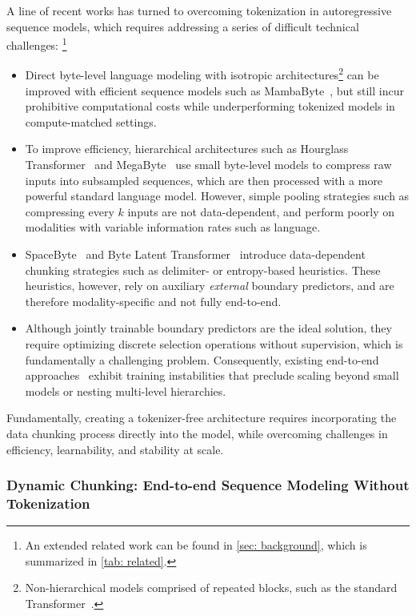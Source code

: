 \documentclass{article}
\newcommand{\citep}{\parencite}
\theoremstyle{plain}
\theoremstyle{remark}
\begin{document}
A line of recent works has turned to overcoming tokenization in autoregressive sequence models, which requires addressing a series of difficult technical challenges:
\footnote{An extended related work can be found in \cref{sec: background}, which is summarized in \cref{tab: related}.}
\begin{itemize}
    \item Direct byte-level language modeling with isotropic architectures\footnote{Non-hierarchical models comprised of repeated blocks, such as the standard Transformer~\citep{Transformer}.} can be improved with efficient sequence models such as MambaByte~\citep{MambaByte}, 
    but still incur prohibitive computational costs while underperforming tokenized models in compute-matched settings.
    \item To improve efficiency, hierarchical architectures such as Hourglass Transformer~\citep{HourglassTransformer} and MegaByte~\citep{MegaByte} use small byte-level models to compress raw inputs into subsampled sequences, which are then processed with a more powerful standard language model. However, simple pooling strategies such as compressing every $k$ inputs are not data-dependent, and perform poorly on modalities with variable information rates such as language.
    \item SpaceByte~\citep{SpaceByte} and Byte Latent Transformer~\citep{BLT} introduce data-dependent chunking strategies such as delimiter- or entropy-based heuristics. These heuristics, however, rely on auxiliary \emph{external} boundary predictors, and are therefore modality-specific and not fully end-to-end.
    \item
    Although jointly trainable boundary predictors are the ideal solution, they require optimizing discrete selection operations without supervision, which is fundamentally a challenging problem.
    Consequently, existing end-to-end approaches~\citep{DPT} exhibit training instabilities that preclude scaling beyond small models or nesting multi-level hierarchies.
\end{itemize}
Fundamentally, creating a tokenizer-free architecture requires incorporating the data chunking process directly into the model, while overcoming challenges in efficiency, learnability, and stability at scale.

\subsubsection*{Dynamic Chunking: End-to-end Sequence Modeling Without Tokenization}
\end{document}
